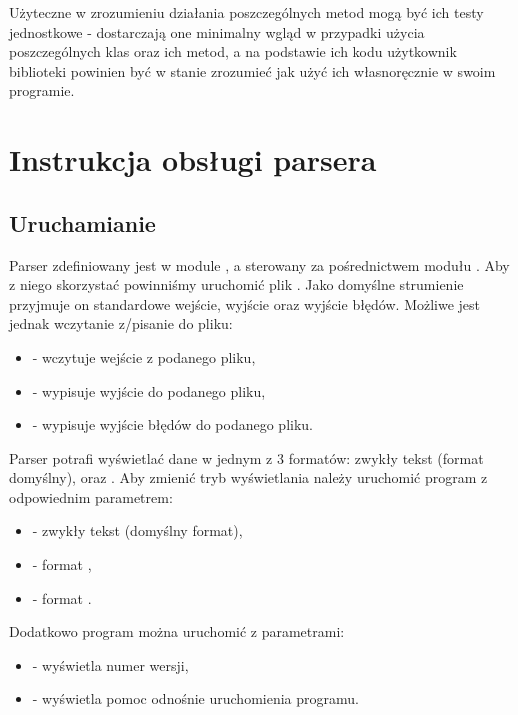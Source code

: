 \documentclass[polish]{standalone}
\begin{document}
Użyteczne w zrozumieniu działania poszczególnych metod mogą być ich testy jednostkowe - dostarczają one minimalny wgląd
w przypadki użycia poszczególnych klas oraz ich metod, a na podstawie ich kodu użytkownik biblioteki powinien być w
stanie zrozumieć jak użyć ich własnoręcznie w swoim programie.

\chapter{Instrukcja obsługi parsera}

\section{Uruchamianie}

Parser zdefiniowany jest w module , a sterowany za pośrednictwem modułu . Aby z niego skorzystać
powinniśmy uruchomić plik . Jako domyślne strumienie przyjmuje on standardowe wejście, wyjście
oraz wyjście błędów. Możliwe jest jednak wczytanie z/pisanie do pliku:
\begin{itemize}
\item {} - wczytuje wejście z podanego pliku,
\item {} - wypisuje wyjście do podanego pliku,
\item {} - wypisuje wyjście błędów do podanego pliku.
\end{itemize}

Parser potrafi wyświetlać dane w jednym z 3 formatów: zwykły tekst (format domyślny),  oraz . Aby
zmienić tryb wyświetlania należy uruchomić program z odpowiednim parametrem:
\begin{itemize}
\item {} - zwykły tekst (domyślny format),
\item {} - format ,
\item {} - format .
\end{itemize}

Dodatkowo program można uruchomić z parametrami:
\begin{itemize}
\item {} - wyświetla numer wersji,
\item {} - wyświetla pomoc odnośnie uruchomienia programu.
\end{itemize}
\end{document}
